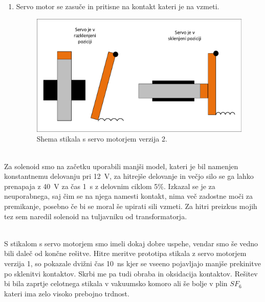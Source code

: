 \documentclass[a4paper,twoside,openright,12pt,Slovene]{book}
\begin{document}
\begin{enumerate}
    \item  Servo motor se zasuče in pritisne na kontakt kateri je na vzmeti.
    \begin{figure}[H]
        \centering
        \includegraphics[width=1\columnwidth]{Sheme/StikaloServoVerzija2.pdf}
        \caption{\label{StikaloServoVerzija2} Shema stikala s servo motorjem verzija 2.}
    \end{figure}
\end{enumerate}


    ~\\Za solenoid smo na začetku uporabili manjši model, kateri je bil namenjen konstantnemu delovanju pri \SI{12}{\volt}, za hitrejše delovanje in večjo silo se ga lahko prenapaja z  \SI{40}{\volt} za čas  \SI{1}{\second} z delovnim ciklom 5\%. Izkazal se je za neuporabnega, saj čim se na njega namesti kontakt, nima več zadostne moči za premikanje, posebno če bi se moral še upirati sili vzmeti. Za hitri preizkus mojih tez sem naredil solenoid na tuljavniku od transformatorja.
    
    ~\\S stikalom s servo motorjem smo imeli dokaj dobre uspehe, vendar smo še vedno bili daleč od končne rešitve. Hitre meritve prototipa stikala z servo motorjem verzija 1, so pokazale dvižni čas  \SI{10}{\nano\second} kjer se vseeno pojavljajo manjše prekinitve po sklenitvi kontaktov. Skrbi me pa tudi obraba in oksidacija kontaktov. Rešitev bi bila zaprtje celotnega stikala v vakuumsko komoro ali še bolje v plin $SF_{6}$ kateri ima zelo visoko prebojno trdnost.
    
\end{document}
